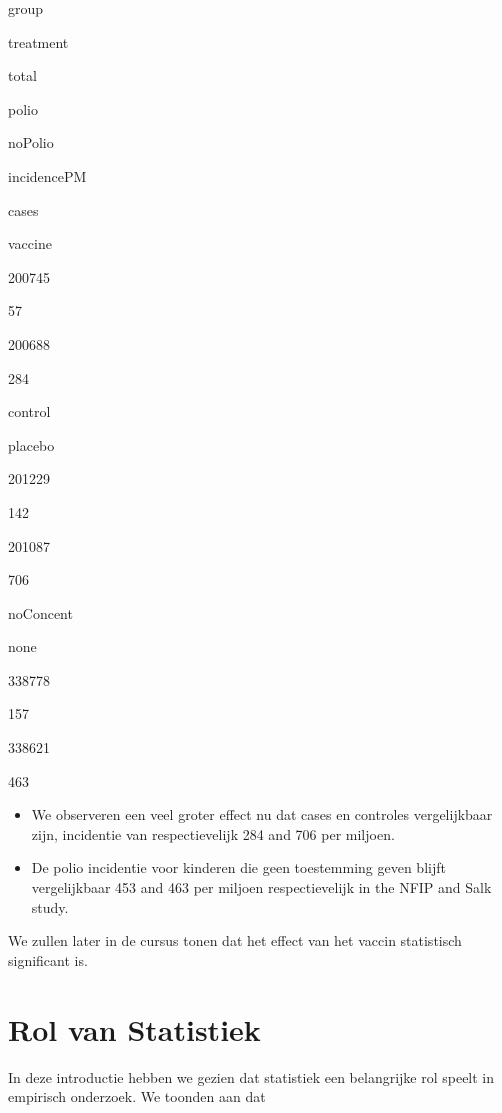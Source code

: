 \documentclass[
  12pt,dutch,coursenotes]{book}
\theoremstyle{definition}
\theoremstyle{definition}
\theoremstyle{definition}
\theoremstyle{remark}
\begin{document}
group

treatment

total

polio

noPolio

incidencePM

cases

vaccine

200745

57

200688

284

control

placebo

201229

142

201087

706

noConcent

none

338778

157

338621

463

\begin{itemize}
\item
  We observeren een veel groter effect nu dat cases en controles vergelijkbaar zijn, incidentie van respectievelijk 284 and 706 per miljoen.
\item
  De polio incidentie voor kinderen die geen toestemming geven blijft vergelijkbaar 453 and 463 per miljoen respectievelijk in the NFIP and Salk study.
\end{itemize}

We zullen later in de cursus tonen dat het effect van het vaccin statistisch significant is.

\hypertarget{rol-van-statistiek}{%
\section{Rol van Statistiek}\label{rol-van-statistiek}}

In deze introductie hebben we gezien dat statistiek een belangrijke rol speelt in empirisch onderzoek. We toonden aan dat
\end{document}
